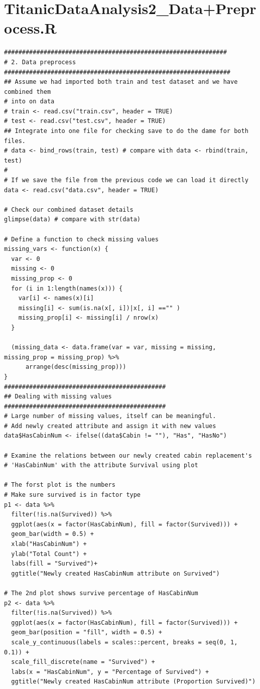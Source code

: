 \documentclass[
]{book}
\begin{document}
\hypertarget{titanicdataanalysis2_datapreprocess.r}{%
\section*{TitanicDataAnalysis2\_Data+Preprocess.R}\label{titanicdataanalysis2_datapreprocess.r}}


\begin{verbatim}
##############################################################
# 2. Data preprocess
###############################################################
## Assume we had imported both train and test dataset and we have combined them
# into on data
# train <- read.csv("train.csv", header = TRUE)
# test <- read.csv("test.csv", header = TRUE)
## Integrate into one file for checking save to do the dame for both files.
# data <- bind_rows(train, test) # compare with data <- rbind(train, test)
#
# If we save the file from the previous code we can load it directly
data <- read.csv("data.csv", header = TRUE)

# Check our combined dataset details
glimpse(data) # compare with str(data)

# Define a function to check missing values
missing_vars <- function(x) {
  var <- 0
  missing <- 0
  missing_prop <- 0
  for (i in 1:length(names(x))) {
    var[i] <- names(x)[i]
    missing[i] <- sum(is.na(x[, i])|x[, i] =="" )
    missing_prop[i] <- missing[i] / nrow(x)
  }

  (missing_data <- data.frame(var = var, missing = missing, missing_prop = missing_prop) %>%
      arrange(desc(missing_prop)))
}
#############################################
## Dealing with missing values
#############################################
# Large number of missing values, itself can be meaningful.
# Add newly created attribute and assign it with new values
data$HasCabinNum <- ifelse((data$Cabin != ""), "Has", "HasNo")

# Examine the relations between our newly created cabin replacement's
# 'HasCabinNum' with the attribute Survival using plot

# The forst plot is the numbers
# Make sure survived is in factor type
p1 <- data %>%
  filter(!is.na(Survived)) %>%
  ggplot(aes(x = factor(HasCabinNum), fill = factor(Survived))) +
  geom_bar(width = 0.5) +
  xlab("HasCabinNum") +
  ylab("Total Count") +
  labs(fill = "Survived")+
  ggtitle("Newly created HasCabinNum attribute on Survived")

# The 2nd plot shows survive percentage of HasCabinNum
p2 <- data %>%
  filter(!is.na(Survived)) %>%
  ggplot(aes(x = factor(HasCabinNum), fill = factor(Survived))) +
  geom_bar(position = "fill", width = 0.5) +
  scale_y_continuous(labels = scales::percent, breaks = seq(0, 1, 0.1)) +
  scale_fill_discrete(name = "Survived") +
  labs(x = "HasCabinNum", y = "Percentage of Survived") +
  ggtitle("Newly created HasCabinNum attribute (Proportion Survived)")


\end{verbatim}
\end{document}
